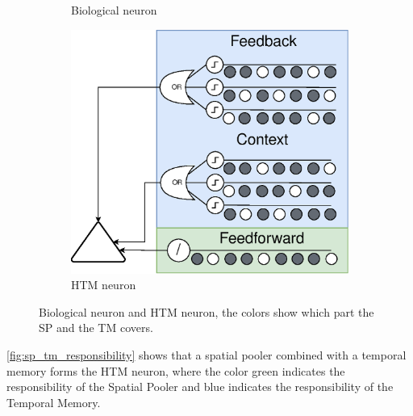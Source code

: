 \begin{figure}[H]
\begin{subfigure}[b]{0.35\linewidth}
        \caption{Biological neuron}
    \end{subfigure}
    \hfill
    \begin{subfigure}[b]{0.55\linewidth}
        \centering
        \includegraphics[width=\linewidth]{resources/related_works/neuron_htm}
        \caption{HTM neuron}
    \end{subfigure}
    \caption[SP and TM Responsibilities]{Biological neuron and HTM neuron, the colors show which part the SP and the TM covers.}
    \label{fig:sp_tm_responsibility}
\end{figure}
\autoref{fig:sp_tm_responsibility} shows that a spatial pooler combined with a temporal memory forms the HTM neuron, where the color green indicates the responsibility of the Spatial Pooler and blue indicates the responsibility of the Temporal Memory.
